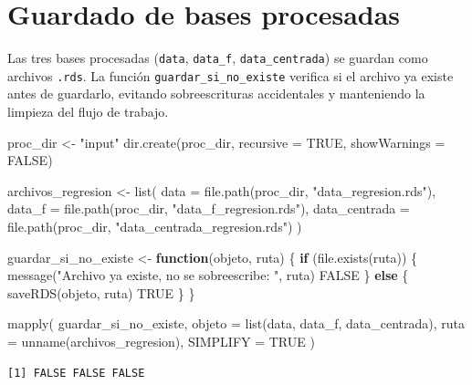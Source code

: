 \documentclass[
  spanish,
  a4paper,
  oneside]{scrbook}
\newenvironment{Shaded}{\begin{snugshade}}{\end{snugshade}}
\newcommand{\AttributeTok}[1]{\textcolor[rgb]{0.40,0.45,0.13}{#1}}
\newcommand{\ConstantTok}[1]{\textcolor[rgb]{0.56,0.35,0.01}{#1}}
\newcommand{\ControlFlowTok}[1]{\textcolor[rgb]{0.00,0.23,0.31}{\textbf{#1}}}
\newcommand{\FunctionTok}[1]{\textcolor[rgb]{0.28,0.35,0.67}{#1}}
\newcommand{\NormalTok}[1]{\textcolor[rgb]{0.00,0.23,0.31}{#1}}
\newcommand{\OtherTok}[1]{\textcolor[rgb]{0.00,0.23,0.31}{#1}}
\newcommand{\StringTok}[1]{\textcolor[rgb]{0.13,0.47,0.30}{#1}}
\begin{document}
\chapter{Guardado de bases
procesadas}\label{guardado-de-bases-procesadas}

Las tres bases procesadas (\texttt{data}, \texttt{data\_f},
\texttt{data\_centrada}) se guardan como archivos \texttt{.rds}. La
función \texttt{guardar\_si\_no\_existe} verifica si el archivo ya
existe antes de guardarlo, evitando sobreescrituras accidentales y
manteniendo la limpieza del flujo de trabajo.

\begin{Shaded}
\begin{Highlighting}[]
\NormalTok{proc\_dir }\OtherTok{\textless{}{-}} \StringTok{"input"}
\FunctionTok{dir.create}\NormalTok{(proc\_dir, }\AttributeTok{recursive =} \ConstantTok{TRUE}\NormalTok{, }\AttributeTok{showWarnings =} \ConstantTok{FALSE}\NormalTok{)}

\NormalTok{archivos\_regresion }\OtherTok{\textless{}{-}} \FunctionTok{list}\NormalTok{(}
  \AttributeTok{data          =} \FunctionTok{file.path}\NormalTok{(proc\_dir, }\StringTok{"data\_regresion.rds"}\NormalTok{),}
  \AttributeTok{data\_f        =} \FunctionTok{file.path}\NormalTok{(proc\_dir, }\StringTok{"data\_f\_regresion.rds"}\NormalTok{),}
  \AttributeTok{data\_centrada =} \FunctionTok{file.path}\NormalTok{(proc\_dir, }\StringTok{"data\_centrada\_regresion.rds"}\NormalTok{)}
\NormalTok{)}

\NormalTok{guardar\_si\_no\_existe }\OtherTok{\textless{}{-}} \ControlFlowTok{function}\NormalTok{(objeto, ruta) \{}
  \ControlFlowTok{if}\NormalTok{ (}\FunctionTok{file.exists}\NormalTok{(ruta)) \{}
    \FunctionTok{message}\NormalTok{(}\StringTok{"Archivo ya existe, no se sobreescribe: "}\NormalTok{, ruta)}
    \ConstantTok{FALSE}
\NormalTok{  \} }\ControlFlowTok{else}\NormalTok{ \{}
    \FunctionTok{saveRDS}\NormalTok{(objeto, ruta)}
    \ConstantTok{TRUE}
\NormalTok{  \}}
\NormalTok{\}}

\FunctionTok{mapply}\NormalTok{(}
\NormalTok{  guardar\_si\_no\_existe,}
  \AttributeTok{objeto =} \FunctionTok{list}\NormalTok{(data, data\_f, data\_centrada),}
  \AttributeTok{ruta =} \FunctionTok{unname}\NormalTok{(archivos\_regresion),}
  \AttributeTok{SIMPLIFY =} \ConstantTok{TRUE}
\NormalTok{)}
\end{Highlighting}
\end{Shaded}

\begin{verbatim}
[1] FALSE FALSE FALSE
\end{verbatim}
\end{document}
